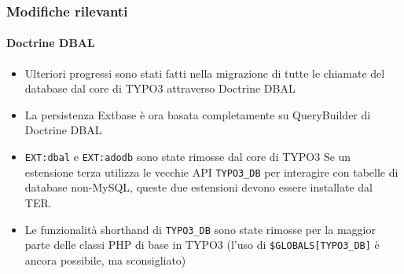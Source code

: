 
\begin{frame}[fragile]
	\frametitle{Modifiche rilevanti}
	\framesubtitle{Doctrine DBAL}

	\begin{itemize}
		\item Ulteriori progressi sono stati fatti nella migrazione di tutte le chiamate del database dal core di TYPO3 attraverso Doctrine DBAL
		\item La persistenza Extbase è ora basata completamente su QueryBuilder di Doctrine DBAL
		\item \texttt{EXT:dbal} e \texttt{EXT:adodb} sono state rimosse dal core di TYPO3\newline
			\smaller
				Se un estensione terza utilizza le vecchie API \texttt{TYPO3\_DB} per interagire con tabelle di database non-MySQL,
				queste due estensioni devono essere installate dal TER.
			\normalsize

		\item Le funzionalità shorthand di \texttt{TYPO3\_DB} sono state rimosse per la maggior parte delle classi PHP di base in TYPO3\newline
			\smaller
				(l'uso di \texttt{\$GLOBALS[TYPO3\_DB]} è ancora possibile, ma sconsigliato)
			\normalsize

	\end{itemize}

\end{frame}


